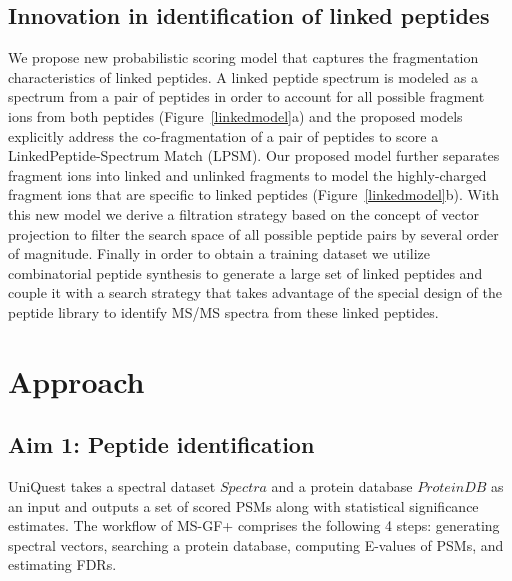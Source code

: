 \subsection{Innovation in identification of linked peptides} 

We propose new probabilistic scoring model that captures the fragmentation characteristics of linked peptides.  A linked peptide spectrum is modeled as a spectrum from a pair of peptides in order to account for all  possible fragment ions from both peptides (Figure~\ref{linkedmodel}a) and the proposed models explicitly address the co-fragmentation of a pair of peptides to score a LinkedPeptide-Spectrum Match (LPSM).  
Our proposed model further separates fragment ions into linked and unlinked fragments to model the highly-charged fragment ions that are specific to linked peptides (Figure~\ref{linkedmodel}b).  With this new model we derive a filtration strategy based on the concept of vector projection to filter the search space of all possible peptide pairs by several order of magnitude.  Finally in order to obtain a training dataset we utilize combinatorial peptide synthesis to generate a large set of linked peptides and couple it with a search strategy that takes advantage of the special design of the peptide library to identify MS/MS spectra from these linked peptides.

\section{Approach}

\subsection{Aim 1: Peptide identification} 

UniQuest  takes a spectral dataset $Spectra$  and a protein database $ProteinDB$ as an input and
outputs a set of scored PSMs along with statistical significance estimates.
The workflow of MS-GF+ comprises
the following 4 steps: generating spectral vectors, searching a protein database, 
computing E-values of PSMs, and estimating FDRs. 


